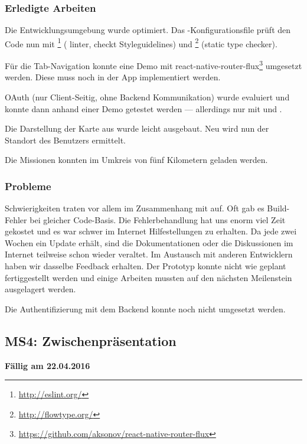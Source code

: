 \subsubsection{Erledigte Arbeiten}
Die Entwicklungsumgebung wurde optimiert. Das -Konfigurationsfile prüft den Code nun mit \footnote{\url{http://eslint.org/}} ( linter, checkt Styleguidelines) und \footnote{\url{http://flowtype.org/}} (static type checker). 

Für die Tab-Navigation konnte eine Demo mit react-native-router-flux\footnote{\url{https://github.com/aksonov/react-native-router-flux}} umgesetzt werden. Diese muss noch in der \kort{} App implementiert werden. 

\gls{OAuth} (nur Client-Seitig, ohne Backend Kommunikation) wurde evaluiert und konnte dann anhand einer Demo getestet werden --- allerdings nur mit  und .

Die Darstellung der Karte aus  wurde leicht ausgebaut. Neu wird nun der Standort des Benutzers ermittelt.

Die Missionen konnten im Umkreis von fünf Kilometern geladen werden.

\subsubsection{Probleme}
Schwierigkeiten traten vor allem im Zusammenhang mit  auf.
Oft gab es Build-Fehler bei gleicher Code-Basis.
Die Fehlerbehandlung hat uns enorm viel Zeit gekostet und es war schwer im Internet Hilfestellungen zu erhalten.
Da  jede zwei Wochen ein Update erhält, sind die Dokumentationen oder die Diskussionen im Internet teilweise schon wieder veraltet.\newline
Im Austausch mit anderen  Entwicklern haben wir dasselbe Feedback erhalten.\newline
Der Prototyp konnte nicht wie geplant fertiggestellt werden und einige Arbeiten mussten auf den nächsten Meilenstein ausgelagert werden.

Die Authentifizierung mit dem Backend konnte noch nicht umgesetzt werden.

\subsection{MS4: Zwischenpräsentation}
\label{pm-ms4}
\textbf{Fällig am 22.04.2016}
